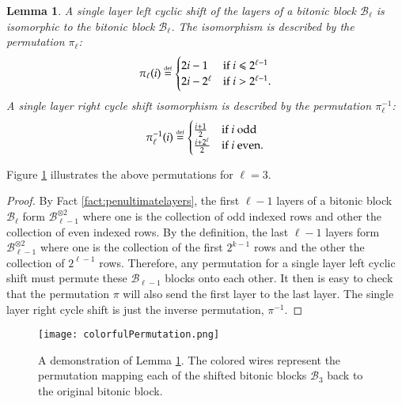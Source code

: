 \documentclass[11pt,letterpaper]{article}
\newtheorem{lemma}[theorem]{Lemma}
\theoremstyle{definition}
\theoremstyle{remark}
\newcommand{\defeq}{\stackrel{\mbox{\normalfont\tiny def}}=}
\newcommand{\cB}{\mathcal B}
\renewcommand{\leq}{\leqslant}
\numberwithin{equation}{section}
\theoremstyle{definition}
\begin{document}
\begin{lemma}
A single layer left cyclic shift of the layers of a bitonic block $\mathcal{B}_\ell$ is isomorphic to the bitonic block $\mathcal{B}_\ell$. The isomorphism is described by the permutation $\pi_\ell$:
\begin{equation}
\pi_\ell(i) \defeq \begin{cases} 2i - 1 & \textrm{if } i \leq 2^{\ell-1} \\ 2i - 2^\ell & \textrm{if } i > 2^{\ell-1}. \end{cases}
\end{equation}
A single layer right cycle shift isomorphism is described by the permutation $\pi_\ell^{-1}$:
\begin{equation}
\pi_\ell^{-1}(i) \defeq \begin{cases} \frac{i+1}{2} & \textrm{if } i \textrm{ odd} \\
\frac{i + 2^\ell}{2} & \textrm{if } i \textrm{ even}.\end{cases}
\end{equation}
\label{lem:permutation}
\end{lemma}

Figure \ref{fig:colorfulPermutation} illustrates the above permutations for $\ell=3$.

\begin{proof}
By Fact \ref{fact:penultimatelayers}, the first $\ell - 1$ layers of a bitonic block $\cB_\ell$ form $\cB_{\ell-1}^{\otimes 2}$ where one is the collection of odd indexed rows and other the collection of even indexed rows. By the definition, the last $\ell-1$ layers form $\cB_{\ell-1}^{\otimes 2}$ where one is the collection of the first $2^{k-1}$ rows and the other the collection of $2^{\ell-1}$ rows. Therefore, any permutation for a single layer left cyclic shift must permute these $\cB_{\ell-1}$ blocks onto each other. It then is easy to check that the permutation $\pi$ will also send the first layer to the last layer. The single layer right cycle shift is just the inverse permutation, $\pi^{-1}$.
\end{proof}

\begin{figure}[h]
\begin{center}
\texttt{[image: colorfulPermutation.png]}
\end{center}
\caption{A demonstration of Lemma \ref{lem:permutation}. The colored wires represent the permutation mapping each of the shifted bitonic blocks $\cB_3$ back to the original bitonic block. 
\label{fig:colorfulPermutation}}
\end{figure}
\end{document}
